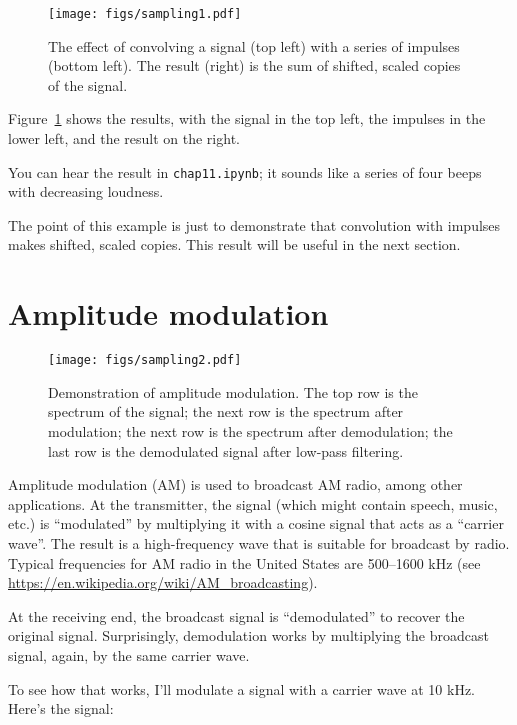 \documentclass[12pt]{book} \usepackage[width=5.5in,height=8.5in, hmarginratio=3:2,vmarginratio=1:1]{geometry}
\begin{document}
\begin{figure} 

\centerline{\texttt{[image: figs/sampling1.pdf]}} \caption{The effect of convolving a signal (top left) with a series of impulses (bottom left). The result (right) is the sum of shifted, scaled copies of the signal.} \label{fig.sampling1} \end{figure} 

Figure~\ref{fig.sampling1} shows the results, with the signal in the top left, the impulses in the lower left, and the result on the right. 

You can hear the result in {\tt chap11.ipynb}; it sounds like a series of four beeps with decreasing loudness. 

The point of this example is just to demonstrate that convolution with impulses makes shifted, scaled copies. This result will be useful in the next section. 

\section{Amplitude modulation} \label{am} 

\begin{figure} 

\centerline{\texttt{[image: figs/sampling2.pdf]}} \caption{Demonstration of amplitude modulation. The top row is the spectrum of the signal; the next row is the spectrum after modulation; the next row is the spectrum after demodulation; the last row is the demodulated signal after low-pass filtering.} \label{fig.sampling2} \end{figure} 

Amplitude modulation (AM) is used to broadcast AM radio, among other applications. At the transmitter, the signal (which might contain speech, music, etc.) is ``modulated'' by multiplying it with a cosine signal that acts as a ``carrier wave''. The result is a high-frequency wave that is suitable for broadcast by radio. Typical frequencies for AM radio in the United States are 500--1600 kHz (see \url{https://en.wikipedia.org/wiki/AM_broadcasting}). 

At the receiving end, the broadcast signal is ``demodulated'' to recover the original signal. Surprisingly, demodulation works by multiplying the broadcast signal, again, by the same carrier wave. 

To see how that works, I'll modulate a signal with a carrier wave at 10 kHz. Here's the signal: 
\end{document}
